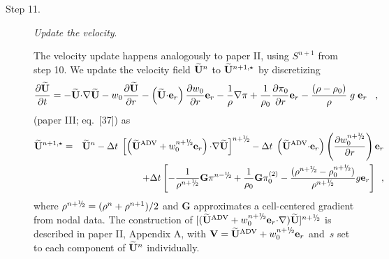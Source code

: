 \begin{description}
\item[Step 11.] {\em Update the velocity}.  

The velocity update happens analogously to paper II, using $S^{n+1}$ from step 10.
We update the velocity field $\widetilde{{\bf U}}^n$ to $\widetilde{{\bf U}}^{n+1,\star}$ by discretizing
\begin{equation}
\frac{\partial\widetilde{{\bf U}}}{\partial t} = - \widetilde{{\bf U}} \mathbf{\cdot} \mathbf{\nabla} \widetilde{{\bf U}} - w_0 \frac{\partial \widetilde{{\bf U}}}{\partial r}
                                 - \left(\widetilde{{\bf U}} \mathbf{\cdot} \mathbf{e}_r\right) \frac{\partial w_0}{\partial r} \mathbf{e}_r
                                 - \frac{1}{\rho} \mathbf{\nabla}\pi
                                 + \frac{1}{\rho_0} \frac{\partial \pi_0}{\partial r} \mathbf{e}_r
                                 - \frac{(\rho-\rho_0)}{\rho} \; g \; \mathbf{e}_r  \label{eq:utildeupd}  \enskip\
 ,
\end{equation}
(paper III; eq.~[37]) as 
\begin{eqnarray}
\Ubt^{n+1,\star} &=& \Ubt^n - \dt \;
 \left[\left(\uadvtwo+ w_0^{\nph} \er\right) \cdotb \nablab \Ubt \right]^\nph
      - \dt \; \left(\uadvtwo \cdotb \er\right)  \left(\frac{\partial w_0^{\nph}}{\partial r} \right) \er \nonumber \\
   &&   + \dt \left[ - \frac{1}{\rho^\nph} {\mathbf{G}} \pi^\nmh
        + \frac{1}{\rho_0} {\mathbf{G}} \pizerotwo
        - \frac{(\rho^\nph-\rhozero^\nph)}{\rho^\nph} g \er \right] \enskip ,
\end{eqnarray}
where $\rho^\nph = ( \rho^n + \rho^{n+1} )/2$
and $\mathbf{G}$ approximates a cell-centered gradient from nodal data. 
The construction of $[(\uadvtwo+ w_0^{\nph} \er \cdotb \nablab) \Ubt ]^\nph$
is described in paper II, Appendix A, with $\Vb = \uadvtwo+w_0^{\nph} \er$ and~$s$ set to each
component of $\widetilde{{\bf U}}^n$ individually.


\end{description}
